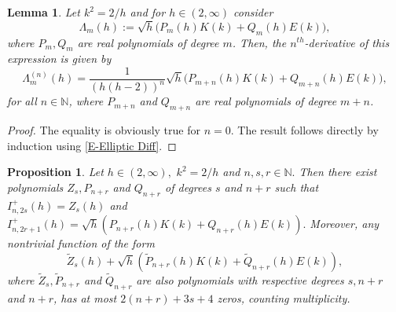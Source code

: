 \documentclass[12pt,psamsfonts]{amsart}
\newtheorem {proposition} [theorem]{Proposition}
\newtheorem {lemma}  [theorem]{Lemma}
\begin{document}
\begin{lemma}
\label{L-differentiating P K + Q E}
    Let $k^2={2}/{h}$ and for $h\in (2,\infty)$ consider
    \begin{equation*}
    \label{E-Lambda}
        \Lambda_m(h):= \sqrt{h}\big(P_m(h) K(k) + Q_m(h) E(k)\big),
    \end{equation*}
    where $P_m,Q_m$ are real polynomials of degree $m$.
    Then, the $n^{th}$-derivative of this expression is given by
    \begin{equation*}
    \label{E-Lambda Diff}
        \Lambda_m^{(n)}(h) = \frac{1}{(h(h-2))^n}\sqrt{h}\big(P_{m+n}(h) K(k) + Q_{m+n}(h) E(k)\big),
    \end{equation*}
    for all $n\in{\mathbb{N}}$,  where $P_{m+n}$ and $Q_{m+n}$ are real polynomials of degree $m+n$.
\end{lemma}

\begin{proof}

The equality is obviously true for $n=0.$ The result follows
directly by induction using  \eqref{E-Elliptic Diff}.

\end{proof}

\begin{proposition}
\label{P bound outside}
    Let $h\in(2,\infty),\,\, k^2={2}/{h}$
and $n,s,r\in {\mathbb{N}}.$ Then there exist polynomials  $Z_s,P_{n+r}$ and $Q_{n+r}$ of degrees $s$ and
$n+r$ such that $I^+_{n,2s}(h)= Z_s(h)$ and $I^+_{n,2r+1}(h)=\sqrt{h} \left(P_{n+r}(h) K(k)+
Q_{n+r}(h) E(k)\right).$ Moreover,  any nontrivial function of the form
\[
\tilde Z_s(h)+\sqrt{h} \left(\tilde P_{n+r}(h) K(k)+ \tilde Q_{n+r}(h) E(k)\right),
\]
where $\tilde Z_s,\tilde P_{n+r}$ and $\tilde Q_{n+r}$ are also polynomials with respective degrees
$s,n+r$ and $n+r$, has at most  $2(n+r)+3s+4$ zeros, counting multiplicity.
\end{proposition}
\end{document}
